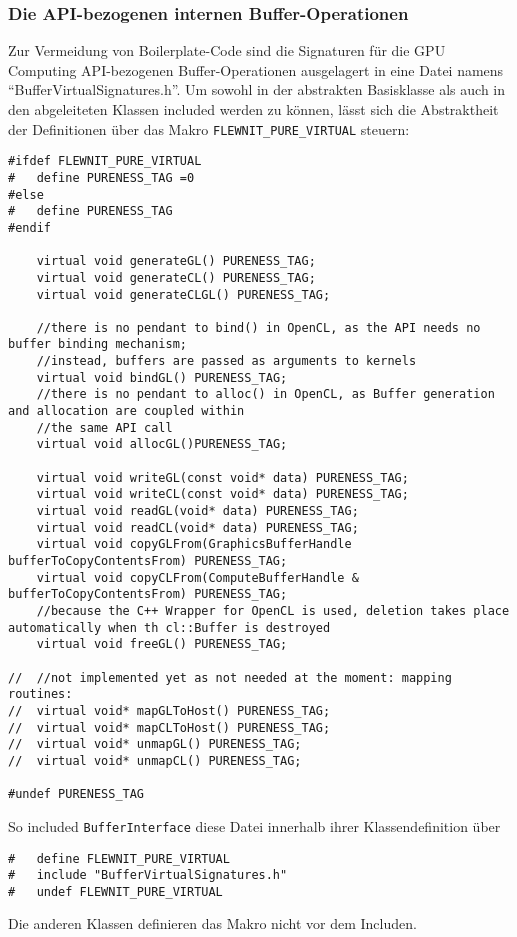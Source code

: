 	\subsubsection{Die API-bezogenen internen Buffer-Operationen}
	Zur Vermeidung von Boilerplate-Code sind die Signaturen für die GPU Computing API-bezogenen 
	Buffer-Operationen ausgelagert in eine Datei namens "`BufferVirtualSignatures.h"'.
	Um sowohl in der abstrakten Basisklasse als auch in den abgeleiteten Klassen included werden zu können,
	lässt sich die Abstraktheit der Definitionen über das Makro \lstinline|FLEWNIT_PURE_VIRTUAL| steuern:
		
	\begin{lstlisting}[caption={API- und Buffertyp-abhängige Operationen auf Buffern -- Definitionen},
					   label=listing:bufferOpDefs]	
#ifdef FLEWNIT_PURE_VIRTUAL
#	define PURENESS_TAG =0
#else
#	define PURENESS_TAG
#endif

	virtual void generateGL() PURENESS_TAG;
	virtual void generateCL() PURENESS_TAG;
	virtual void generateCLGL() PURENESS_TAG;

	//there is no pendant to bind() in OpenCL, as the API needs no buffer binding mechanism;
	//instead, buffers are passed as arguments to kernels
	virtual void bindGL() PURENESS_TAG;
	//there is no pendant to alloc() in OpenCL, as Buffer generation and allocation are coupled within
	//the same API call
	virtual void allocGL()PURENESS_TAG;

	virtual void writeGL(const void* data) PURENESS_TAG;
	virtual void writeCL(const void* data) PURENESS_TAG;
	virtual void readGL(void* data)	PURENESS_TAG;
	virtual void readCL(void* data)	PURENESS_TAG;
	virtual void copyGLFrom(GraphicsBufferHandle bufferToCopyContentsFrom) PURENESS_TAG;
	virtual void copyCLFrom(ComputeBufferHandle & bufferToCopyContentsFrom) PURENESS_TAG;
	//because the C++ Wrapper for OpenCL is used, deletion takes place automatically when th cl::Buffer is destroyed
	virtual void freeGL() PURENESS_TAG;
	
//	//not implemented yet as not needed at the moment: mapping routines:
//	virtual void* mapGLToHost() PURENESS_TAG;
//	virtual void* mapCLToHost() PURENESS_TAG;
//	virtual void* unmapGL() PURENESS_TAG;
//	virtual void* unmapCL() PURENESS_TAG;

#undef PURENESS_TAG
	\end{lstlisting}
	
	So included \lstinline|BufferInterface| diese Datei innerhalb ihrer Klassendefinition über
	\begin{lstlisting}
#	define FLEWNIT_PURE_VIRTUAL
#	include "BufferVirtualSignatures.h"
#	undef FLEWNIT_PURE_VIRTUAL
	\end{lstlisting}
	Die anderen Klassen definieren das Makro nicht vor dem Includen.\\
	
